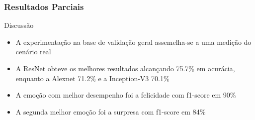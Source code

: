 \documentclass{beamer}
\begin{document}
\begin{frame}
\frametitle{Resultados Parciais}
 \begin{block}{Discussão}
\begin{itemize}
\item A experimentação na base de validação geral assemelha-se a uma medição do cenário real
\item A ResNet obteve os melhores resultados alcançando 75.7\% em acurácia, enquanto a Alexnet 71.2\% e a Inception-V3 70.1\%
\item A emoção com melhor desempenho foi a felicidade com f1-score em 90\%
\pause 
\item A segunda melhor emoção foi a surpresa com f1-score em 84\%
\end{itemize}
\end{block}
\end{frame}
\end{document}
